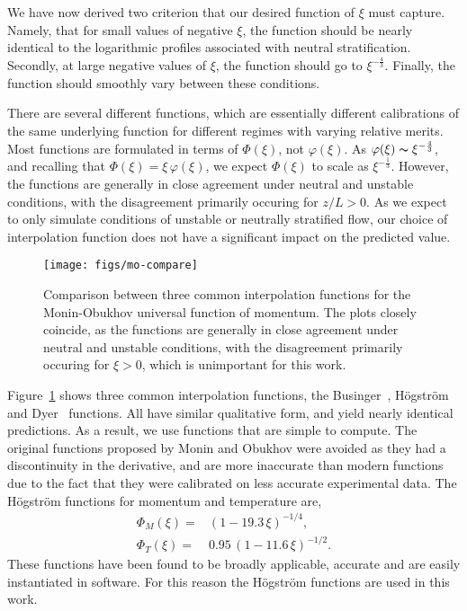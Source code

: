 We have now derived two criterion that our desired function of $\xi$ 
must capture. Namely, that for small values of negative $\xi$, the
function should be nearly identical to the logarithmic profiles
associated with neutral stratification. Secondly, at large negative
values of $\xi$, the function should go to
$\xi^{-\frac{4}{3}}$. Finally, the function should smoothly vary between
these conditions.  

There are several different functions, which are essentially different
calibrations of the same underlying function for different regimes with 
varying relative merits. 
Most functions are formulated in terms of $\Phi(\xi)$, 
not $\varphi(\xi)$. As
$\varphi(\xi) \thicksim \xi^{-\frac{4}{3}}$, and recalling that
$\Phi(\xi) = \xi \, \varphi(\xi)$, we expect 
$\Phi(\xi)$ to scale as $\xi^{-\frac{1}{3}}$.
%
However, the functions are generally in close agreement under neutral
and unstable conditions, with the disagreement primarily occuring for
$z/L>0$. As we expect to only simulate conditions of unstable or
neutrally stratified flow, our choice of interpolation function does not
have a significant impact on the predicted value.  

\begin{figure}[!htb]
 \centering
  \texttt{[image: figs/mo-compare]}\\
 \caption{Comparison between three common interpolation functions for
 the Monin-Obukhov universal function of momentum. The plots closely
 coincide, as the functions are generally in close agreement under
 neutral and unstable conditions, with the disagreement primarily
 occuring for $\xi > 0$, which is unimportant for this work.} 
 \label{fig:interp-mo}
\end{figure}

Figure~\ref{fig:interp-mo} shows three common interpolation  
functions, the Businger~\cite{businger1971flux},
H{\"o}gstr{\"o}m~\cite{hogstrom1988non} and Dyer~\cite{dyer1974review}
functions. All have similar qualitative form,   
and yield nearly identical predictions. As a result, we use functions
that are simple to compute. The original functions 
proposed by Monin and Obukhov were avoided as they had a discontinuity in
the derivative, and are more inaccurate than modern functions due to
the fact that they were calibrated on less accurate experimental
data. The H{\"o}gstr{\"o}m functions for momentum and temperature are, 
\begin{eqnarray}
  \Phi_M(\xi) =& (1-19.3 \, \xi)^{-1/4}, \\
  \Phi_T(\xi) =& 0.95 \, (1-11.6 \,\xi)^{-1/2}.
\end{eqnarray}
These functions have been found to be broadly applicable, accurate and 
are easily instantiated in software. For this reason the
H{\"o}gstr{\"o}m functions are used in this work. 

